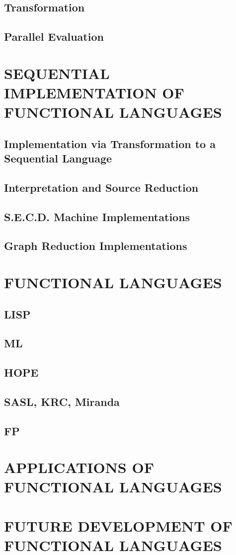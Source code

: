 \documentclass{article}
\begin{document}
\subsection{Transformation}
\subsection{Parallel Evaluation}

\section{SEQUENTIAL IMPLEMENTATION OF FUNCTIONAL LANGUAGES}
\subsection{Implementation via Transformation to a Sequential Language}
\subsection{Interpretation and Source Reduction}
\subsection{S.E.C.D. Machine Implementations}
\subsection{Graph Reduction Implementations}

\section{FUNCTIONAL LANGUAGES}
\subsection{LISP}
\subsection{ML}
\subsection{HOPE}
\subsection{SASL, KRC, Miranda}
\subsection{FP}

\section{APPLICATIONS OF FUNCTIONAL LANGUAGES}

\section{FUTURE DEVELOPMENT OF FUNCTIONAL LANGUAGES}



\listoftodos[TODOS]
\end{document}
